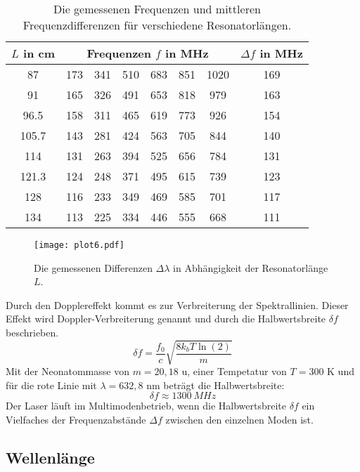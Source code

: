 \begin{table}
 \centering
 \caption{Die gemessenen Frequenzen und mittleren Frequenzdifferenzen für verschiedene Resonatorlängen.}
 \label{tab:longitudinal}
 \begin{tabular}{c c c c c c c c}
   \toprule
   $L$ in cm & \multicolumn{6}{c}{Frequenzen $f$ in MHz} & $\Delta f$ in MHz  \\
   \midrule
   87     & 173 & 341 & 510 & 683 & 851 & 1020 & 169 \\
   91     & 165 & 326 & 491 & 653 & 818 & 979  & 163 \\
   96.5   & 158 & 311 & 465 & 619 & 773 & 926  & 154 \\
   105.7  & 143 & 281 & 424 & 563 & 705 & 844  & 140 \\
   114    & 131 & 263 & 394 & 525 & 656 & 784  & 131 \\
   121.3  & 124 & 248 & 371 & 495 & 615 & 739  & 123 \\
   128    & 116 & 233 & 349 & 469 & 585 & 701  & 117 \\
   134    & 113 & 225 & 334 & 446 & 555 & 668  & 111 \\
   \bottomrule
 \end{tabular}
\end{table}

\begin{figure}
  \centering
  \texttt{[image: plot6.pdf]}
  \caption{Die gemessenen Differenzen $\Delta\lambda$ in Abhängigkeit der Resonatorlänge $L$.}
  \label{fig:longitudinal}
\end{figure}

Durch den Dopplereffekt kommt es zur Verbreiterung der Spektrallinien.
Dieser Effekt wird Doppler-Verbreiterung genannt und durch die Halbwertsbreite $\delta f$ beschrieben.
\begin{equation}
  \delta f = \frac{f_0}{c} \sqrt{\frac{8 k_b T \ln(2)}{m}}
\end{equation}
Mit der Neonatommasse von $m=20,18$ u, einer Tempetatur von $T = 300$ K und für die rote Linie mit $\lambda = 632,8$ nm beträgt die Halbwertsbreite:
\begin{equation*}
  \delta f \approx \SI{1300}{MHz}
\end{equation*}
Der Laser läuft im Multimodenbetrieb, wenn die Halbwertsbreite $\delta f$ ein Vielfaches der Frequenzabstände $\Delta f$ zwischen den einzelnen Moden ist.

\subsection{Wellenlänge}
\label{sec:wel}

